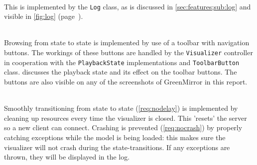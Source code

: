 \begin{description}
\item\textbf{}\\This is implemented by the \lstinline{Log} class, as is discussed in \cref{sec:features;sub:log} and visible in \cref{fig:log} (page~\pageref{fig:log}).
\item\textbf{}\\Browsing from state to state is implemented by use of a toolbar with navigation buttons. The workings of these buttons are handled by the \lstinline{Visualizer} controller in cooperation with the \lstinline{PlaybackState} implementations and \lstinline{ToolbarButton} class.  discusses the playback state and its effect on the toolbar buttons. The buttons are also visible on any of the screenshots of GreenMirror in this report.
\item\textbf{} \\Smoothly transitioning from state to state (\cref{req:nodelay}) is implemented by cleaning up resources every time the visualizer is closed. This 'resets' the server so a new client can connect. Crashing is prevented (\cref{req:nocrash}) by properly catching exceptions while the model is being loaded: this makes sure the visualizer will not crash during the state-transitions. If any exceptions are thrown, they will be displayed in the log.
\end{description}